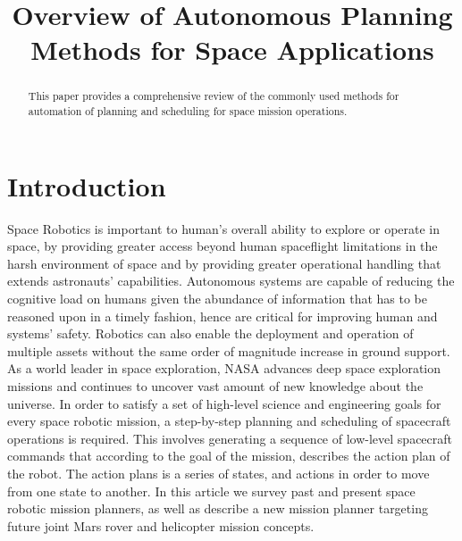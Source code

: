 \documentclass[conference]{IEEEtran}
\begin{document}

\title{\huge Overview of Autonomous Planning Methods for Space Applications}


\maketitle

\begin{abstract}
This paper provides a comprehensive review of the commonly used methods for automation of planning and scheduling for space mission operations.
\end{abstract}

\section{Introduction}
Space Robotics is important to human’s overall ability to explore or operate in space, by providing greater access beyond human spaceflight limitations in the harsh environment of space and by providing greater operational handling that extends astronauts’ capabilities. Autonomous systems are capable of reducing the cognitive load on humans given the abundance of information that has to be reasoned upon in a timely fashion, hence are critical for improving human and systems’ safety. Robotics can also enable the deployment and operation of multiple assets without the same order of magnitude increase in ground support.
As a world leader in space exploration, NASA advances deep space exploration missions and continues to uncover vast amount of new knowledge about the universe.
In order to satisfy a set of high-level science and engineering goals for every space robotic mission, a step-by-step planning and scheduling of spacecraft operations is required. This involves generating a sequence of low-level spacecraft commands that according to the goal of the mission, describes the action plan of the robot. The action plans is a series of states, and actions in order to move from one state to another.
In this article we survey past and present space robotic mission planners, as well as describe a new mission planner targeting future joint Mars rover and helicopter mission concepts.
\end{document}

